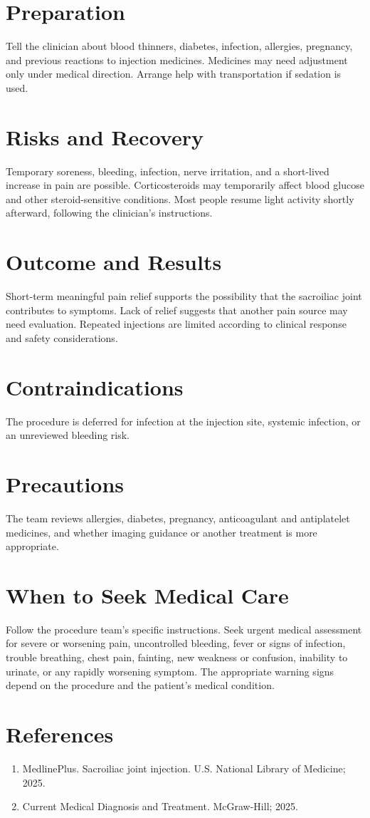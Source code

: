 \section*{Preparation}
Tell the clinician about blood thinners, diabetes, infection, allergies, pregnancy, and previous reactions to injection medicines. Medicines may need adjustment only under medical direction. Arrange help with transportation if sedation is used.

\section*{Risks and Recovery}
Temporary soreness, bleeding, infection, nerve irritation, and a short-lived increase in pain are possible. Corticosteroids may temporarily affect blood glucose and other steroid-sensitive conditions. Most people resume light activity shortly afterward, following the clinician's instructions.

\section*{Outcome and Results}
Short-term meaningful pain relief supports the possibility that the sacroiliac joint contributes to symptoms. Lack of relief suggests that another pain source may need evaluation. Repeated injections are limited according to clinical response and safety considerations.

\section*{Contraindications}
The procedure is deferred for infection at the injection site, systemic infection, or an unreviewed bleeding risk.

\section*{Precautions}
The team reviews allergies, diabetes, pregnancy, anticoagulant and antiplatelet medicines, and whether imaging guidance or another treatment is more appropriate.

\section*{When to Seek Medical Care}
Follow the procedure team's specific instructions. Seek urgent medical assessment for severe or worsening pain, uncontrolled bleeding, fever or signs of infection, trouble breathing, chest pain, fainting, new weakness or confusion, inability to urinate, or any rapidly worsening symptom. The appropriate warning signs depend on the procedure and the patient's medical condition.

\section*{References}
\begin{enumerate}
  \item MedlinePlus. Sacroiliac joint injection. U.S. National Library of Medicine; 2025.
  \item Current Medical Diagnosis and Treatment. McGraw-Hill; 2025.
\end{enumerate}
\clearpage
